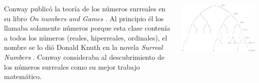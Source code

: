 \documentclass[20pt,margin=2.2cm,innermargin=-4.5in,blockverticalspace=-0.25in]{tikzposter}
\begin{document}
\begin{columns}
{        Conway public\'o la teor\'ia de los n\'umeros surreales en su libro \textit{On numbers and Games} \cite{Conway2000}. Al principio \'el los llamaba solamente n\'umeros porque esta clase conten\'ia a todos los n\'umeros (reales, hiperreales, ordinales), el nombre se lo di\'o Donald Knuth en la novela \textit{Surreal Numbers} \cite{Knuth1974-wh}. Conway consideraba al descubrimiento de los n\'umeros surreales como su mejor trabajo matem\'atico.
        \vspace{5mm}

        \begin{minipage}[t]{\linewidth}
            \centering
            \includegraphics[width=.98\textwidth]{images/surreal-infinite.pdf}
        \end{minipage}
    }
    

\end{columns}
\end{document}
